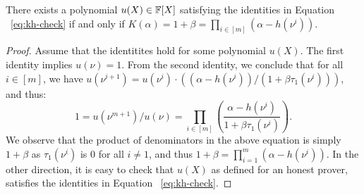 \begin{lemma}\label{lem:kh-check}
There exists a polynomial $u(X)\in \mathbb{F}[X]$ satisfying the identities in Equation ~\eqref{eq:kh-check}
if and only if $K(\alpha)=1+\beta=\prod_{i\in [m]} (\alpha - h(\nu^i))$.
\end{lemma}
\begin{proof}
    Assume that the identitites hold for some polynomial $u(X)$.
    The first identity implies $u(\nu)=1$. From the second identity, we conclude that for all $i\in [m]$, we have
    $u(\nu^{i+1})=u(\nu^i)\cdot ((\alpha - h(\nu^i))/(1+\beta \tau_1(\nu^i)))$, and thus:
    $$1 = u(\nu^{m+1})/u(\nu) = \prod_{i\in [m]}\left(\frac{\alpha - h(\nu^i)}{1+\beta \tau_1(\nu^i)}\right).$$
    We observe that the product of denominators in the above equation is simply $1+\beta$ as $\tau_1(\nu^i)$
    is $0$ for all $i\neq 1$, and thus $1+\beta = \prod_{i=1}^m (\alpha - h(\nu^i))$. In the other direction,
    it is easy to check that $u(X)$ as defined for an honest prover, satisfies the identities in Equation ~\ref{eq:kh-check}.
\end{proof}

